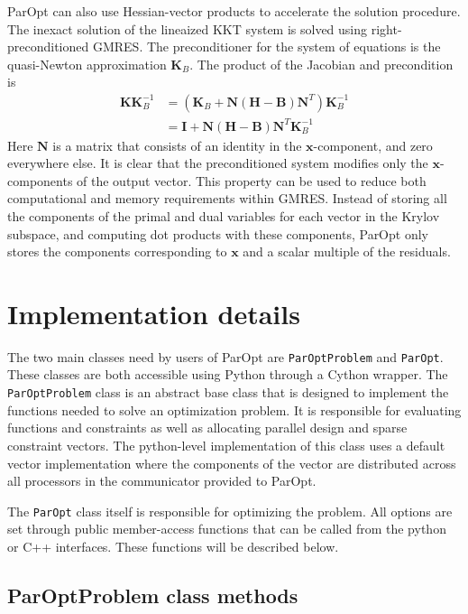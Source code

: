 \documentclass[12pt]{article}
\newcommand{\mb}{\mathbf}
\begin{document}
ParOpt can also use Hessian-vector products to accelerate the solution procedure.
The inexact solution of the lineaized KKT system is solved using right-preconditioned GMRES.
The preconditioner for the system of equations is the quasi-Newton approximation $\mb{K}_{B}$.
The product of the Jacobian and precondition is
%
\begin{equation}
  \begin{aligned}
    \mb{K}\mb{K}_{B}^{-1} & = \left(\mb{K}_{B} + 
    \mb{N}\left(\mb{H} - \mb{B}\right)\mb{N}^{T}\right)\mb{K}_{B}^{-1} \\
    & = \mb{I} + \mb{N} \left(\mb{H} - \mb{B} \right) \mb{N}^{T} \mb{K}_{B}^{-1}
  \end{aligned}
\end{equation}
Here $\mb{N}$ is a matrix that consists of an identity in the $\mb{x}$-component, and zero everywhere else.
It is clear that the preconditioned system modifies only the $\mb{x}$-components of the output vector.
This property can be used to reduce both computational and memory requirements within GMRES. 
Instead of storing all the components of the primal and dual variables for each vector in the Krylov subspace, and computing dot products with these components, ParOpt only stores the components corresponding to $\mb{x}$ and a scalar multiple of the residuals.

\section{Implementation details}

The two main classes need by users of ParOpt are \texttt{ParOptProblem} and \texttt{ParOpt}.
These classes are both accessible using Python through a Cython wrapper.
The \texttt{ParOptProblem} class is an abstract base class that is designed to implement the functions needed to solve an optimization problem. 
It is responsible for evaluating functions and constraints as well as allocating parallel design and sparse constraint vectors.
The python-level implementation of this class uses a default vector implementation where the components of the vector are distributed across all processors in the communicator provided to ParOpt.

The \texttt{ParOpt} class itself is responsible for optimizing the problem.
All options are set through public member-access functions that can be called from the python or C++ interfaces.
These functions will be described below.

\subsection{ParOptProblem class methods}
\end{document}
